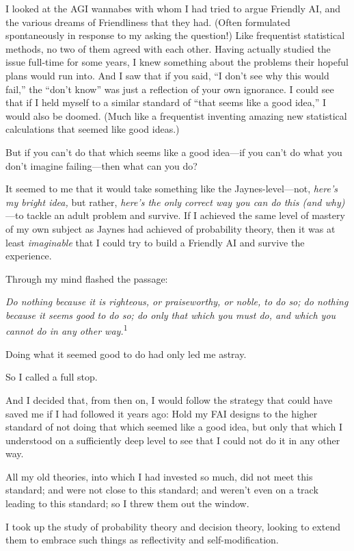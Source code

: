 {
 I looked at the AGI wannabes with whom I had tried to argue
Friendly AI, and the various dreams of Friendliness that they had.
(Often formulated spontaneously in response to my asking the question!)
Like frequentist statistical methods, no two of them agreed with each
other. Having actually studied the issue full-time for some years, I
knew something about the problems their hopeful plans would run into.
And I saw that if you said, ``I don't
see why this would fail,'' the
``don't know'' was
just a reflection of your own ignorance. I could see that if I held
myself to a similar standard of ``that seems like a
good idea,'' I would also be doomed. (Much like a
frequentist inventing amazing new statistical calculations that seemed
like good ideas.)}

{
 But if you can't do that which seems like a good
idea---if you can't do what you don't
imagine failing---then what can you do?}

{
 It seemed to me that it would take something like the
Jaynes-level---not, \textit{here's my bright idea,} but
rather, \textit{here's the only correct way you can do
this (and why)}{}---to tackle an adult problem and survive. If I
achieved the same level of mastery of my own subject as Jaynes had
achieved of probability theory, then it was at least
\textit{imaginable} that I could try to build a Friendly AI and survive
the experience.}

{
 Through my mind flashed the passage:}

{
 \textit{Do nothing because it is righteous, or praiseworthy, or
noble, to do so; do nothing because it seems good to do so; do only
that which you must do, and which you cannot do in any other
way.}\textsuperscript{1}}

{
 Doing what it seemed good to do had only led me astray.}

{
 So I called a full stop.}

{
 And I decided that, from then on, I would follow the strategy that
could have saved me if I had followed it years ago: Hold my FAI designs
to the higher standard of not doing that which seemed like a good idea,
but only that which I understood on a sufficiently deep level to see
that I could not do it in any other way.}

{
 All my old theories, into which I had invested so much, did not
meet this standard; and were not close to this standard; and
weren't even on a track leading to this standard; so I
threw them out the window.}

{
 I took up the study of probability theory and decision theory,
looking to extend them to embrace such things as reflectivity and
self-modification.}

